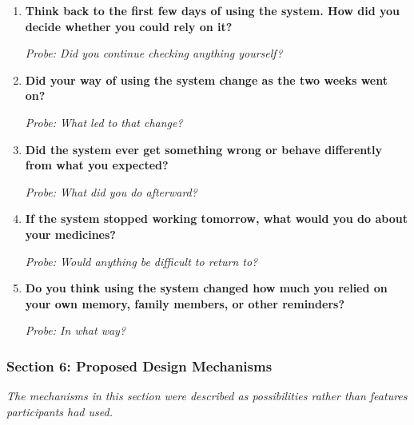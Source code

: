 \begin{enumerate}[resume]
  \item \textbf{Think back to the first few days of using the system. How did you decide whether you could rely on it?}

  \textit{Probe: Did you continue checking anything yourself?}
  \item \textbf{Did your way of using the system change as the two weeks went on?}

  \textit{Probe: What led to that change?}
  \item \textbf{Did the system ever get something wrong or behave differently from what you expected?}

  \textit{Probe: What did you do afterward?}
  \item \textbf{If the system stopped working tomorrow, what would you do about your medicines?}

  \textit{Probe: Would anything be difficult to return to?}
  \item \textbf{Do you think using the system changed how much you relied on your own memory, family members, or other reminders?}

  \textit{Probe: In what way?}
\end{enumerate}

\subsubsection{Section 6: Proposed Design Mechanisms}

\textit{The mechanisms in this section were described as possibilities rather than features participants had used.}

